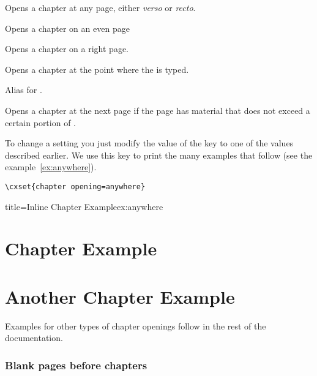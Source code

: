 \begin{marglist}
\item [any] Opens a chapter at any page, either \textit{verso} or \textit{recto}.
\item [left] Opens a chapter on an even page
\item [right] Opens a chapter on a right page.
\item [anywhere] Opens a chapter at the point where the  is typed.
\item [none] Alias for .
\item [ifafter] Opens a chapter at the next page if the page has material that does not exceed a certain portion of .
\end{marglist}

To change a setting you just modify the value of the key  to one of the values described earlier. We use this key to print the many examples that follow (see the example~\ref{ex:anywhere}). 



\begin{tcolorbox}
\begin{lstlisting}
\cxset{chapter opening=anywhere}
\end{lstlisting}
\end{tcolorbox}

\makeatletter
\@specialfalse
\makeatother

\begin{texexample}{title=Inline Chapter Example}{ex:anywhere}
\lorem
\chapter{Chapter Example}
\lorem
\chapter{Another Chapter Example}
\lorem
\end{texexample}

\addtocounter{chapter}{-1}

Examples for other types of chapter openings follow in the rest of the documentation.

\subsection{Blank pages before chapters}

